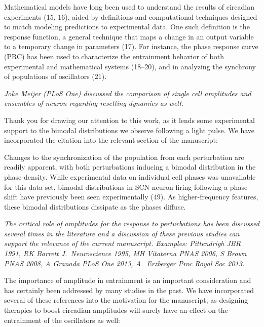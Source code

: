 \documentclass[11pt, letterpaper]{article}
\newenvironment{reviewer}{\itshape\color{gray}}{}
\newenvironment{manuscript}[1]{\begin{center}\begin{tcolorbox}[colback=green!5!white,colframe=green!75!black,width=0.8\textwidth,title={#1},breakable,fonttitle=\bfseries]}{\end{tcolorbox}\end{center}}
\begin{document}
\begin{manuscript}{Page 3}
Mathematical models have long been used to understand the results of circadian experiments (15, 16), aided by definitions and computational techniques designed to match modeling predictions to experimental data.
One such definition is the response function, a general technique that maps a change in an output variable to a temporary change in parameters (17).
For instance, the phase response curve (PRC) has been used to characterize the entrainment behavior of both experimental and mathematical systems (18–20), and in analyzing the synchrony of populations of oscillators (21).
\end{manuscript}

\begin{reviewer}
Joke Meijer (PLoS One) discussed the comparison of single cell amplitudes and ensembles of neuron regarding resetting dynamics as well. 
\end{reviewer}
 
Thank you for drawing our attention to this work, as it lends some experimental support to the bimodal distributions we observe following a light pulse.
We have incorporated the citation into the relevant section of the manuscript:

\begin{manuscript}{Page 14}
Changes to the synchronization of the population from each perturbation are readily apparent, with both perturbations inducing a bimodal distribution in the phase density.
While experimental data on individual cell phases was unavailable for this data set, bimodal distributions in SCN neuron firing following a phase shift have previously been seen experimentally (49).
As higher-frequency features, these bimodal distributions dissipate as the phases diffuse.
\end{manuscript}

\begin{reviewer}
The critical role of amplitudes for the response to perturbations has been discussed several times in the literature and a discussion of these previous studies can support the relevance of the current manuscript.
Examples: Pittendrigh JBR 1991, RK Barrett J.~Neuroscience 1995, MH Vitaterna PNAS 2006, S Brown PNAS 2008, A Granada PLoS One 2013, A.~Erzberger Proc Royal Soc 2013.

\end{reviewer}

The importance of amplitude in entrainment is an important consideration and has certainly been addressed by many studies in the past.
We have incorporated several of these references into the motivation for the manuscript, as designing therapies to boost circadian amplitudes will surely have an effect on the entrainment of the oscillators as well:
\end{document}
